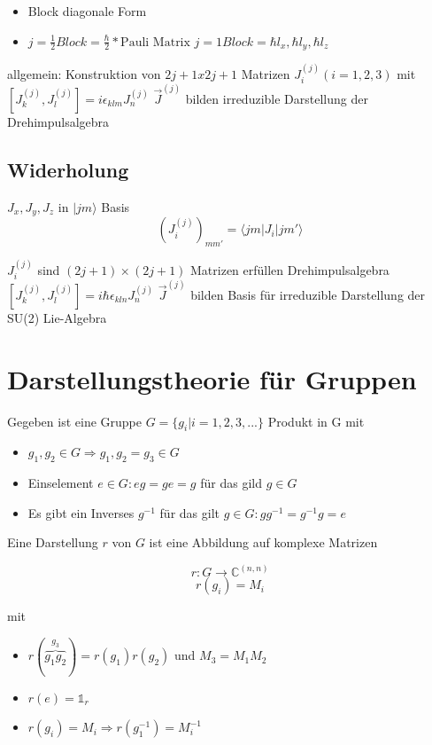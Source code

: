 \begin{itemize}
\item Block diagonale Form
\item \(j=\frac 1 2 Block = \frac \hbar 2 * \text{Pauli Matrix}\)
\(j=1 Block=\hbar l_x,\hbar l_y,\hbar l_z\)
\end{itemize}

allgemein: Konstruktion von \(2j+1x2j+1\) Matrizen
\(J_i^{(j)}(i=1,2,3)\) mit \([J_k^{(j)},J_l^{(j)}]=i\epsilon_{klm}J_n^{(j)}\)
\(\vec J^{(j)}\) bilden irreduzible Darstellung der Drehimpulsalgebra




\subsection{Widerholung}

\(J_x,J_y,J_z\) in \(|jm\rangle\) Basis
\[ (J_i^{(j)})_{mm'} = \langle jm|J_i|jm'\rangle\]

\(J_i^{(j)}\) sind \((2j+1)\times(2j+1)\) Matrizen erfüllen Drehimpulsalgebra
\([J_k^{(j)},J_l^{(j)}]=i\hbar\epsilon_{kln}J_n^{(j)}\) 
\(\vec J^{(j)}\) bilden Basis für irreduzible Darstellung der SU(2) Lie-Algebra


\section{Darstellungstheorie für Gruppen}

Gegeben ist eine Gruppe \(G=\{g_i| i=1,2,3,...\}\) Produkt in G mit

\begin{itemize}
\item \(g_1,g_2\in G \Rightarrow g_1,g_2=g_3 \in G\)
\item Einselement \(e\in G: eg=ge=g\) für das gild \(g\in G\)
\item Es gibt ein Inverses \(g^{-1}\) für das gilt \(g\in G: gg^{-1}=g^{-1}g=e\)
\end{itemize}

Eine Darstellung \(r\) von \(G\) ist eine Abbildung auf komplexe Matrizen

\[ r:G\rightarrow \mathbb C^{(n,n)} \]
\[ r(g_i) = M_i \]

mit
\begin{itemize}
\item  \(r(\overbrace{g_1g_2}^{g_3})=r(g_1)r(g_2)\) und \(M_3=M_1M_2\)
\item \(r(e) = \mathbb 1_r\)
\item \(r(g_i)= M_i \Rightarrow r(g_1^{-1})=M_i^{-1}\)
\end{itemize}

